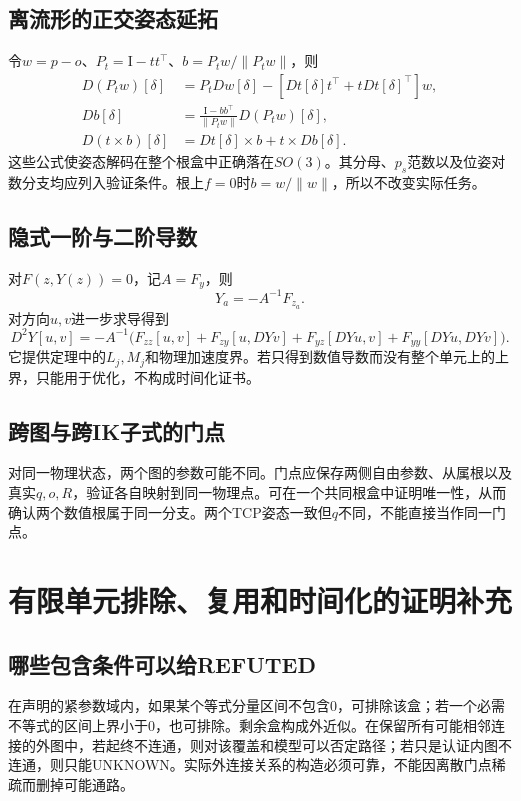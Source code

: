 \documentclass[UTF8,11pt,a4paper,fontset=fandol]{ctexart}
\numberwithin{equation}{section}
\theoremstyle{definition}
\newcommand{\Id}{\mathrm I}
\begin{document}
\subsection{离流形的正交姿态延拓}
令$w=p-o$、$P_t=\Id-tt^\top$、$b=P_tw/\|P_tw\|$，则
\begin{align}
 D(P_tw)[\delta]&=P_tD w[\delta]-[Dt[\delta]t^\top+tDt[\delta]^\top]w,\\
 Db[\delta]&=\frac{\Id-bb^\top}{\|P_tw\|}D(P_tw)[\delta],\\
 D(t\times b)[\delta]&=Dt[\delta]\times b+t\times Db[\delta].
\end{align}
这些公式使姿态解码在整个根盒中正确落在$SO(3)$。其分母、$p_s$范数以及位姿对数分支均应列入验证条件。根上$f=0$时$b=w/\|w\|$，所以不改变实际任务。

\subsection{隐式一阶与二阶导数}
对$F(z,Y(z))=0$，记$A=F_y$，则
\begin{equation}
 Y_a=-A^{-1}F_{z_a}.
\end{equation}
对方向$u,v$进一步求导得到
\begin{equation}
 D^2Y[u,v]=-A^{-1}\bigl(
 F_{zz}[u,v]+F_{zy}[u,DYv]+F_{yz}[DYu,v]+F_{yy}[DYu,DYv]
 \bigr).
 \label{eq:implicit2}
\end{equation}
它提供定理中的$L_j,M_j$和物理加速度界。若只得到数值导数而没有整个单元上的上界，只能用于优化，不构成时间化证书。

\subsection{跨图与跨IK子式的门点}
对同一物理状态，两个图的参数可能不同。门点应保存两侧自由参数、从属根以及真实$q,o,R$，验证各自映射到同一物理点。可在一个共同根盒中证明唯一性，从而确认两个数值根属于同一分支。两个TCP姿态一致但$q$不同，不能直接当作同一门点。

\section{有限单元排除、复用和时间化的证明补充}
\subsection{哪些包含条件可以给REFUTED}
在声明的紧参数域内，如果某个等式分量区间不包含0，可排除该盒；若一个必需不等式的区间上界小于0，也可排除。剩余盒构成外近似。在保留所有可能相邻连接的外图中，若起终不连通，则对该覆盖和模型可以否定路径；若只是认证内图不连通，则只能UNKNOWN。实际外连接关系的构造必须可靠，不能因离散门点稀疏而删掉可能通路。
\end{document}
